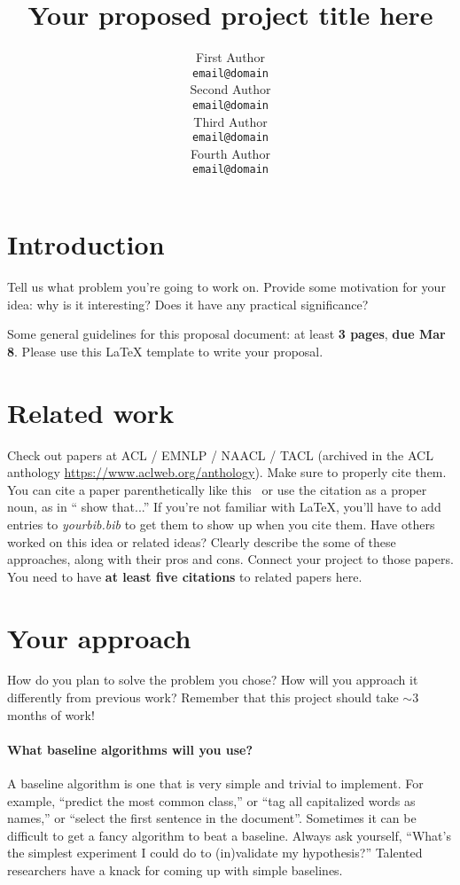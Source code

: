 \documentclass[11pt,a4paper]{article}
\title{Your proposed project title here}
\author{First Author \\
  {\tt email@domain} \\\And
  Second Author \\
  {\tt email@domain} \\\And
  Third Author \\
  {\tt email@domain} \\\And
  Fourth Author \\
  {\tt email@domain} \\}
\date{}
\begin{document}
\maketitle

\section{Introduction}
Tell us what problem you're going to work on. Provide some motivation for your idea: why is it interesting? Does it have any practical significance? 

Some general guidelines for this proposal document: at least \textbf{3 pages}, \textbf{due Mar 8}. Please use this LaTeX template to write your proposal.

\section{Related work}

Check out papers at ACL / EMNLP / NAACL / TACL (archived in the ACL anthology \url{https://www.aclweb.org/anthology}). Make sure to properly cite them. You can cite a paper parenthetically like this~\cite{andrew2007scalable} or use the citation as a proper noun, as in `` show that...'' If you're not familiar with LaTeX, you'll have to add entries to \emph{yourbib.bib} to get them to show up when you cite them. 
Have others worked on this idea or related ideas? Clearly describe the some of these approaches, along with their pros and cons. Connect your project to those papers. You need to have \textbf{at least five citations} to related papers here. 

\section{Your approach}
How do you plan to solve the problem you chose? How will you approach it differently from previous work? Remember that this project should take $\sim 3$ months of work! 

\paragraph{What baseline algorithms will you use?}
A baseline algorithm is one that is very simple and trivial to implement. For example, ``predict the most common class,'' or ``tag all capitalized words as names,'' or ``select the first sentence in the document''. Sometimes it can be difficult to get a fancy algorithm to beat a baseline. Always ask yourself, ``What's the simplest experiment I could do to (in)validate my hypothesis?'' Talented researchers have a knack for coming up with simple baselines. 
\end{document}

